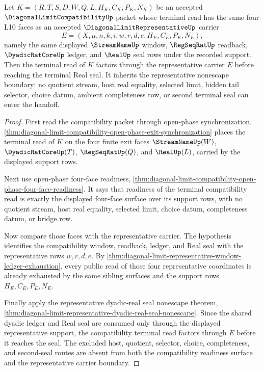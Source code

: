 \begin{theorem}
\label{thm:diagonal-limit-compatibility-representative-handoff}
Let $K=(R,T,S,D,W,Q,L,H_K,C_K,P_K,N_K)$ be an accepted $\DiagonalLimitCompatibilityUp$ packet whose terminal read has the same four L10 faces as an accepted $\DiagonalLimitRepresentativeUp$ carrier
$$
E=(X,\mu,n,k,i,w,r,d,e,H_E,C_E,P_E,N_E),
$$
namely the same displayed $\StreamNameUp$ window, $\RegSeqRatUp$ readback, $\DyadicRatCoreUp$ ledger, and $\RealUp$ seal rows under the recorded support. Then the terminal read of $K$ factors through the representative carrier $E$ before reaching the terminal Real seal. It inherits the representative nonescape boundary: no quotient stream, host real equality, selected limit, hidden tail selector, choice datum, ambient completeness row, or second terminal seal can enter the handoff.
\end{theorem}
\begin{proof}
First read the compatibility packet through open-phase synchronization. \autoref{thm:diagonal-limit-compatibility-open-phase-exit-synchronization} places the terminal read of $K$ on the four finite exit faces $\StreamNameUp(W)$, $\DyadicRatCoreUp(T)$, $\RegSeqRatUp(Q)$, and $\RealUp(L)$, carried by the displayed support rows.

Next use open-phase four-face readiness, \autoref{thm:diagonal-limit-compatibility-open-phase-four-face-readiness}. It says that readiness of the terminal compatibility read is exactly the displayed four-face surface over its support rows, with no quotient stream, host real equality, selected limit, choice datum, completeness datum, or bridge row.

Now compare those faces with the representative carrier. The hypothesis identifies the compatibility window, readback, ledger, and Real seal with the representative rows $w,r,d,e$. By \autoref{thm:diagonal-limit-representative-window-ledger-exhaustion}, every public read of those four representative coordinates is already exhausted by the same sibling surfaces and the support rows $H_E,C_E,P_E,N_E$.

Finally apply the representative dyadic-real seal nonescape theorem, \autoref{thm:diagonal-limit-representative-dyadic-real-seal-nonescape}. Since the shared dyadic ledger and Real seal are consumed only through the displayed representative support, the compatibility terminal read factors through $E$ before it reaches the seal. The excluded host, quotient, selector, choice, completeness, and second-seal routes are absent from both the compatibility readiness surface and the representative carrier boundary.
\end{proof}
